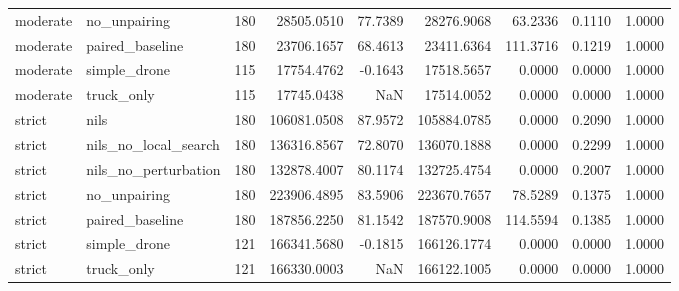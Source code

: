 \begin{tabular}{llrrrrrrr}
moderate & no_unpairing & 180 & 28505.0510 & 77.7389 & 28276.9068 & 63.2336 & 0.1110 & 1.0000 \\
moderate & paired_baseline & 180 & 23706.1657 & 68.4613 & 23411.6364 & 111.3716 & 0.1219 & 1.0000 \\
moderate & simple_drone & 115 & 17754.4762 & -0.1643 & 17518.5657 & 0.0000 & 0.0000 & 1.0000 \\
moderate & truck_only & 115 & 17745.0438 & NaN & 17514.0052 & 0.0000 & 0.0000 & 1.0000 \\
strict & nils & 180 & 106081.0508 & 87.9572 & 105884.0785 & 0.0000 & 0.2090 & 1.0000 \\
strict & nils_no_local_search & 180 & 136316.8567 & 72.8070 & 136070.1888 & 0.0000 & 0.2299 & 1.0000 \\
strict & nils_no_perturbation & 180 & 132878.4007 & 80.1174 & 132725.4754 & 0.0000 & 0.2007 & 1.0000 \\
strict & no_unpairing & 180 & 223906.4895 & 83.5906 & 223670.7657 & 78.5289 & 0.1375 & 1.0000 \\
strict & paired_baseline & 180 & 187856.2250 & 81.1542 & 187570.9008 & 114.5594 & 0.1385 & 1.0000 \\
strict & simple_drone & 121 & 166341.5680 & -0.1815 & 166126.1774 & 0.0000 & 0.0000 & 1.0000 \\
strict & truck_only & 121 & 166330.0003 & NaN & 166122.1005 & 0.0000 & 0.0000 & 1.0000 \\
\bottomrule
\end{tabular}
